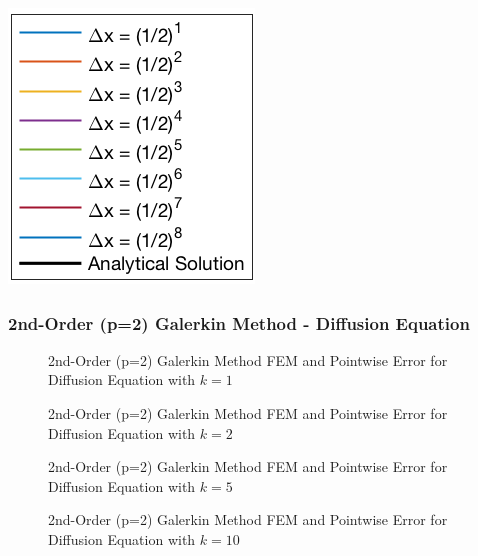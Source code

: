 \documentclass[10pt]{article}		%
\numberwithin{equation}{section}
\begin{document}
\begin{center}
	\includegraphics[height = 0.11\linewidth]{legend}
\end{center}

\subsubsection{2nd-Order (p=2) Galerkin Method - Diffusion Equation}

\begin{figure}[H]
	\begin{center}
		\caption{2nd-Order (p=2) Galerkin Method FEM and Pointwise Error for Diffusion Equation with $k = 1$}
	\end{center}
\end{figure}

\begin{figure}[H]
	\begin{center}
		\caption{2nd-Order (p=2) Galerkin Method FEM and Pointwise Error for Diffusion Equation with $k = 2$}
	\end{center}
\end{figure}

\begin{figure}[H]
	\begin{center}
		\caption{2nd-Order (p=2) Galerkin Method FEM and Pointwise Error for Diffusion Equation with $k = 5$}
	\end{center}
\end{figure}

\newpage

\begin{figure}[H]
	\begin{center}
		\caption{2nd-Order (p=2) Galerkin Method FEM and Pointwise Error for Diffusion Equation with $k = 10$}
	\end{center}
\end{figure}
\end{document}
